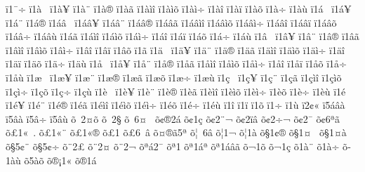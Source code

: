 {^^ef1^^af^^f7
^^ef1^^e0^^a0
^^ef1^^e0^^a5
^^ef1^^e0^^a8
^^ef1^^e0^^ae
^^ef1^^e0^^e3
^^ef1^^e0^^ec^^ee
^^ef1^^e0^^ec^^f5
^^ef1^^e0^^ec^^f7
^^ef1^^e0^^ee
^^ef1^^e0^^ef
^^ef1^^e0^^f5
^^ef1^^e0^^f7
^^ef1^^e0^^f9
^^ef1^^e1^^a0
^^ef1^^e1^^a5
^^ef1^^e1^^a8
^^ef1^^e1^^ae
^^ef1^^e1^^e2^^a0
^^ef1^^e1^^e2^^a5
^^ef1^^e1^^e2^^a8
^^ef1^^e1^^e2^^ae
^^ef1^^e1^^e2^^e3
^^ef1^^e1^^e2^^ec^^ee
^^ef1^^e1^^e2^^ec^^f5
^^ef1^^e1^^e2^^ec^^f7
^^ef1^^e1^^e2^^ee
^^ef1^^e1^^e2^^ef
^^ef1^^e1^^e2^^f5
^^ef1^^e1^^e2^^f7
^^ef1^^e1^^e2^^f9
^^ef1^^e1^^e3
^^ef1^^e1^^ec^^ee
^^ef1^^e1^^ec^^f5
^^ef1^^e1^^ec^^f7
^^ef1^^e1^^ee
^^ef1^^e1^^ef
^^ef1^^e1^^f5
^^ef1^^e1^^f7
^^ef1^^e1^^f9
^^ef1^^e2^^a0
^^ef1^^e2^^a5
^^ef1^^e2^^a8
^^ef1^^e2^^ae
^^ef1^^e2^^e3
^^ef1^^e2^^ec^^ee
^^ef1^^e2^^ec^^f5
^^ef1^^e2^^ec^^f7
^^ef1^^e2^^ee
^^ef1^^e2^^ef
^^ef1^^e2^^f5
^^ef1^^e3
^^ef1^^e4^^a0
^^ef1^^e4^^a5
^^ef1^^e4^^a8
^^ef1^^e4^^ae
^^ef1^^e4^^e3
^^ef1^^e4^^ec^^ee
^^ef1^^e4^^ec^^f5
^^ef1^^e4^^ec^^f7
^^ef1^^e4^^ee
^^ef1^^e4^^ef
^^ef1^^e4^^f5
^^ef1^^e4^^f7
^^ef1^^e4^^f9
^^ef1^^e5^^a0
^^ef1^^e5^^a5
^^ef1^^e5^^a8
^^ef1^^e5^^ae
^^ef1^^e5^^e3
^^ef1^^e5^^ec^^ee
^^ef1^^e5^^ec^^f5
^^ef1^^e5^^ec^^f7
^^ef1^^e5^^ee
^^ef1^^e5^^ef
^^ef1^^e5^^f5
^^ef1^^e5^^f7
^^ef1^^e5^^f9
^^ef1^^e6^^a0
^^ef1^^e6^^a5
^^ef1^^e6^^a8
^^ef1^^e6^^ae
^^ef1^^e6^^e3
^^ef1^^e6^^f5
^^ef1^^e6^^f7
^^ef1^^e6^^f9
^^ef1^^e7^^a0
^^ef1^^e7^^a5
^^ef1^^e7^^a8
^^ef1^^e7^^e3
^^ef1^^e7^^ec^^ee
^^ef1^^e7^^ec^^f5
^^ef1^^e7^^ec^^f7
^^ef1^^e7^^f5
^^ef1^^e7^^f7
^^ef1^^e7^^f9
^^ef1^^e8^^a0
^^ef1^^e8^^a5
^^ef1^^e8^^a8
^^ef1^^e8^^ae
^^ef1^^e8^^e3
^^ef1^^e8^^ec^^ee
^^ef1^^e8^^ec^^f5
^^ef1^^e8^^ec^^f7
^^ef1^^e8^^f5
^^ef1^^e8^^f7
^^ef1^^e8^^f9
^^ef1^^e9^^a0
^^ef1^^e9^^a5
^^ef1^^e9^^a8
^^ef1^^e9^^ae
^^ef1^^e9^^e3
^^ef1^^e9^^ec^^ee
^^ef1^^e9^^ec^^f5
^^ef1^^e9^^ec^^f7
^^ef1^^e9^^f5
^^ef1^^e9^^f7
^^ef1^^e9^^f9
^^ef1^^ee
^^ef1^^ef
^^ef1^^f5
^^ef1^^f7
^^ef1^^f9
^^ef2^^a2^^ab
^^ef5^^e1^^e2^^e0
^^ef5^^e2^^e0
^^ef5^^e2^^f7
^^ef5^^e2^^f9
^^f5^^a02^^a4^^f5
^^f5^^a02^^a7
^^f5^^a06^^a4^^a0
^^f5^^a2^^ae2^^e1
^^f5^^a21^^e7
^^f5^^a22^^ad^^a8^^ac
^^f5^^a22^^ad^^ef^^e2
^^f5^^a22^^ad^^f7^^ac
^^f5^^a22^^af
^^f5^^a26^^aa^^e3
^^f5^^a31^^ab^^a0.
^^f5^^a31^^ab^^a8
^^f5^^a31^^ab^^ae
^^f5^^a31^^ad
^^f5^^a36^^ad^^a0^^e2
^^f5^^a4^^ae^^e35^^aa
^^f5^^a6^^a06^^e2
^^f5^^a61^^ac
^^f5^^a61^^e0
^^f5^^a71^^a2^^ae
^^f5^^a71^^a4^^a0
^^f5^^a71^^a4^^e0
^^f5^^a75^^a2^^a8
^^f5^^a75^^a2^^f7
^^f5^^a82^^a3
^^f5^^a82^^a4
^^f5^^a82^^ac
^^f5^^aa^^e12^^af
^^f5^^aa1^^ad
^^f5^^aa1^^e1^^aa
^^f5^^aa1^^e1^^e2^^e3
^^f5^^ac1^^ad^^f5
^^f5^^ac1^^e7
^^f5^^ad1^^e0^^a8
^^f5^^ad1^^e0^^f7
^^f5^^ad1^^e0^^f9
^^f5^^ad5^^e0^^f5
^^f5^^ae^^a11^^ab
^^f5^^ae1^^e1
}
